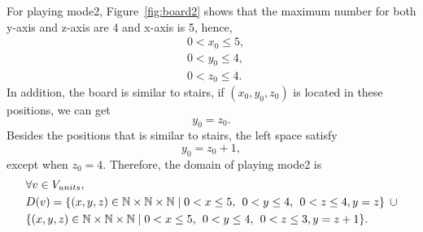 For playing mode2, Figure~\ref{fig:board2} shows that the maximum number for both y-axis and z-axis are 4 and x-axis is 5, hence, 
\begin{equation}
\begin{aligned}
&0<x_{0}\leq5,\\
&0<y_{0}\leq4,\\
&0<z_{0}\leq4.
\end{aligned}
\end{equation}
In addition, the board is similar to stairs, if $(x_{0},y_{0},z_{0})$ is located in these positions, we can get
\begin{equation}
y_{0}=z_{0}.
\end{equation}
Besides the positions that is similar to stairs, the left space satisfy 
\begin{equation}
y_{0}=z_{0}+1,
\end{equation}
except when $z_{0}=4$.
Therefore, the domain of playing mode2 is
\begin{equation}
\begin{aligned}
&\forall v \in V_{units},\\
&D(v)=\{(x,y,z) \in \mathbb{N} \times \mathbb{N}	\times \mathbb{N} \mid  0<x \leq 5 , \hspace{1ex} 0<y \leq 4,\hspace{1ex} 0<z \leq 4,y=z\} \hspace{1ex}\cup\\
&\{(x,y,z) \in \mathbb{N} \times \mathbb{N}	\times \mathbb{N} \mid  0<x \leq 5, \hspace{1ex} 0<y \leq 4,\hspace{1ex} 0<z \leq 3,y=z+1\}.
\end{aligned}
\end{equation}

